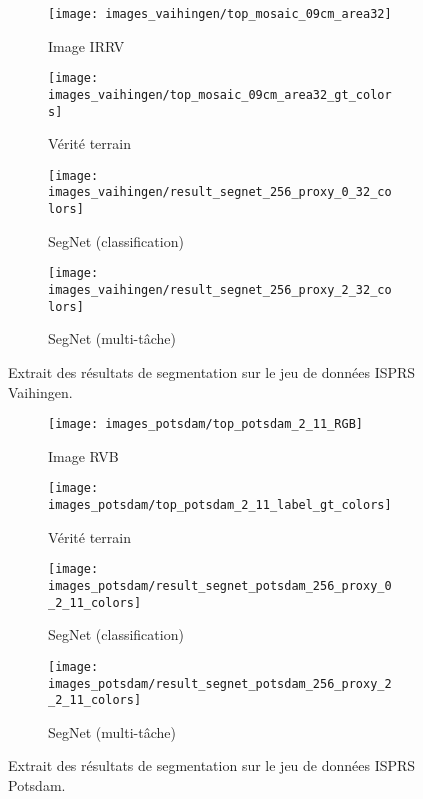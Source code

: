 \begin{figure}[t]
\begin{subfigure}{0.24\textwidth}
	\texttt{[image: images\_vaihingen/top\_mosaic\_09cm\_area32]}
    \caption{Image IRRV}
\end{subfigure}
\begin{subfigure}{0.24\textwidth}
	\texttt{[image: images\_vaihingen/top\_mosaic\_09cm\_area32\_gt\_colors]}
    \caption{Vérité terrain}
\end{subfigure}
\begin{subfigure}{0.24\textwidth}
	\texttt{[image: images\_vaihingen/result\_segnet\_256\_proxy\_0\_32\_colors]}
    \caption{SegNet (classification)}
\end{subfigure}
\begin{subfigure}{0.24\textwidth}
	\texttt{[image: images\_vaihingen/result\_segnet\_256\_proxy\_2\_32\_colors]}
    \caption{SegNet (multi-tâche)}
\end{subfigure}
\caption{Extrait des résultats de segmentation sur le jeu de données ISPRS Vaihingen.\\\isprslegende}
\label{fig:isprs_vaihingen}
\end{figure}

\begin{figure}[t]
\begin{subfigure}{0.24\textwidth}
	\texttt{[image: images\_potsdam/top\_potsdam\_2\_11\_RGB]}
    \caption{Image RVB}
\end{subfigure}
\hfill
\begin{subfigure}{0.24\textwidth}
	\texttt{[image: images\_potsdam/top\_potsdam\_2\_11\_label\_gt\_colors]}
    \caption{Vérité terrain}
\end{subfigure}
\hfill
\begin{subfigure}{0.24\textwidth}
	\texttt{[image: images\_potsdam/result\_segnet\_potsdam\_256\_proxy\_0\_2\_11\_colors]}
    \caption{SegNet (classification)}
\end{subfigure}
\hfill
\begin{subfigure}{0.24\textwidth}
	\texttt{[image: images\_potsdam/result\_segnet\_potsdam\_256\_proxy\_2\_2\_11\_colors]}
    \caption{SegNet (multi-tâche)}
\end{subfigure}
\caption{Extrait des résultats de segmentation sur le jeu de données ISPRS Potsdam.\\\isprslegende}
\label{fig:isprs_potsdam}
\end{figure}

